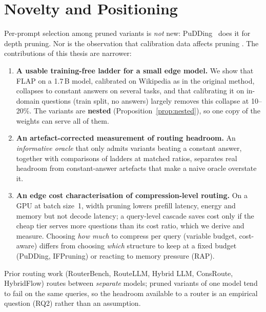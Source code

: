 \documentclass[11pt,a4paper]{article}
\begin{document}
\section{Novelty and Positioning}
Per-prompt selection among pruned variants is \emph{not} new: PuDDing~\citep{wee2025pudding} does it
for depth pruning. Nor is the observation that calibration data affects pruning
\citep{williams2024calibration,bandari2024c4}. The contributions of this thesis are narrower:
\begin{enumerate}
  \item \textbf{A usable training-free ladder for a small edge model.} We show that FLAP on a 1.7\,B model,
  calibrated on Wikipedia as in the original method, collapses to constant answers on several tasks, and that
  calibrating it on in-domain questions (train split, no answers) largely removes this collapse at 10--20\%.
  The variants are \textbf{nested} (Proposition~\ref{prop:nested}), so one copy of the weights can serve all of them.
  \item \textbf{An artefact-corrected measurement of routing headroom.} An \emph{informative oracle} that only
  admits variants beating a constant answer, together with comparisons of ladders at matched ratios, separates
  real headroom from constant-answer artefacts that make a naive oracle overstate it.
  \item \textbf{An edge cost characterisation of compression-level routing.} On a GPU at batch size~1, width
  pruning lowers prefill latency, energy and memory but not decode latency; a query-level cascade saves cost only
  if the cheap tier serves more questions than its cost ratio, which we derive and measure. Choosing \emph{how
  much} to compress per query (variable budget, cost-aware) differs from choosing \emph{which} structure to keep
  at a fixed budget (PuDDing, IFPruning) or reacting to memory pressure (RAP).
\end{enumerate}
Prior routing work (RouterBench, RouteLLM, Hybrid LLM, ConsRoute, HybridFlow) routes between
\emph{separate} models; pruned variants of one model tend to fail on the same queries, so the headroom
available to a router is an empirical question (RQ2) rather than an assumption.

\end{document}
